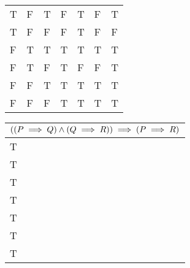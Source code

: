 \documentclass[12pt]{article}
\makeatletter
\newcommand*{\arabicodd}[1]{%
  \expandafter\@arabicodd\csname c@#1\endcsname
}
\newcommand*{\@arabicodd}[1]{%
  \@arabic{\numexpr(#1)*2-1\relax}%
}
\makeatother
\begin{document}
\begin{enumerate}[label=2.\arabicodd*, start=24]
\begin{minipage}{\linewidth}
\begin{tabular}{@{}lllllll@{}}
            T & F & T & F              & T              & F                                             & T              \\
            T & F & F & F              & T              & F                                             & F              \\
            F & T & T & T              & T              & T                                             & T              \\
            F & T & F & T              & F              & F                                             & T              \\
            F & F & T & T              & T              & T                                             & T              \\
            F & F & F & T              & T              & T                                             & T              \\ \bottomrule
          \end{tabular}
          \small
          \linebreak
          \linebreak
          \linebreak
          \linebreak
          \begin{tabular}{@{}l@{}}
            \toprule
            $\qty(\qty(P \implies Q) \land \qty(Q \implies R)) \implies \qty(P \implies R)$ \\ \midrule
            T                                                                               \\
            T                                                                               \\
            T                                                                               \\
            T                                                                               \\
            T                                                                               \\
            T                                                                               \\
            T                                                                               \\ \bottomrule
          \end{tabular}
        \end{minipage}

\end{enumerate}
\end{document}
